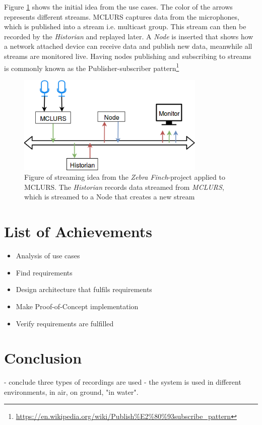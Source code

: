 \noindent Figure \ref{fig:streamingidea:idea} shows the initial idea from the use cases.
The color of the arrows represents different streams. MCLURS captures data from the microphones, which is published into a stream i.e. multicast group.
This stream can then be recorded by the \textit{Historian} and replayed later.
A \textit{Node} is inserted that shows how a network attached device can receive data and publish new data, meanwhile all streams are monitored live. Having nodes publishing and subscribing to streams is commonly known as the Publisher-subscriber pattern\footnote{\url{https://en.wikipedia.org/wiki/Publish\%E2\%80\%93subscribe_pattern}}
\begin{figure}[H]
	\centering
	\includegraphics[width=0.8\textwidth]{figures/streaming_idea_all}
	\caption{Figure of streaming idea from the \textit{Zebra Finch}-project applied to MCLURS. The \textit{Historian} records data streamed from \textit{MCLURS}, which is streamed to a Node that creates a new stream} \label{fig:streamingidea:idea}
\end{figure}

\section{List of Achievements}
\begin{itemize}
	\item Analysis of use cases
	\item Find requirements
	\item Design architecture that fulfils requirements
	\item Make Proof-of-Concept implementation
	\item Verify requirements are fulfilled
\end{itemize}

\section{Conclusion}
- conclude three types of recordings are used
- the system is used in different environments, in air, on ground, "in water".
